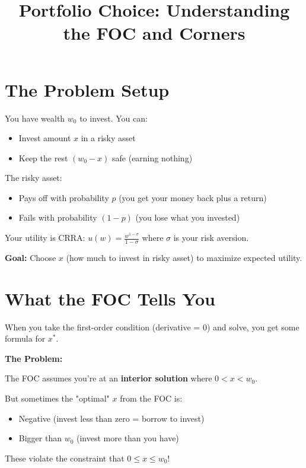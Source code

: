 \documentclass[12pt]{article}
\title{\textbf{Portfolio Choice: Understanding the FOC and Corners}}
\author{}
\date{}
\begin{document}
\maketitle

\section*{The Problem Setup}

You have wealth $w_0$ to invest. You can:
\begin{itemize}
\item Invest amount $x$ in a risky asset
\item Keep the rest $(w_0 - x)$ safe (earning nothing)
\end{itemize}

The risky asset:
\begin{itemize}
\item Pays off with probability $p$ (you get your money back plus a return)
\item Fails with probability $(1-p)$ (you lose what you invested)
\end{itemize}

Your utility is CRRA: $u(w) = \frac{w^{1-\sigma}}{1-\sigma}$ where $\sigma$ is your risk aversion.

\textbf{Goal:} Choose $x$ (how much to invest in risky asset) to maximize expected utility.

\section*{What the FOC Tells You}

When you take the first-order condition (derivative = 0) and solve, you get some formula for $x^*$.

\begin{tcolorbox}[colback=blue!5!white,colframe=blue!75!black]
\textbf{The Problem:}

The FOC assumes you're at an \textbf{interior solution} where $0 < x < w_0$.

But sometimes the "optimal" $x$ from the FOC is:
\begin{itemize}
\item Negative (invest less than zero = borrow to invest)
\item Bigger than $w_0$ (invest more than you have)
\end{itemize}

These violate the constraint that $0 \leq x \leq w_0$!
\end{tcolorbox}
\end{document}
